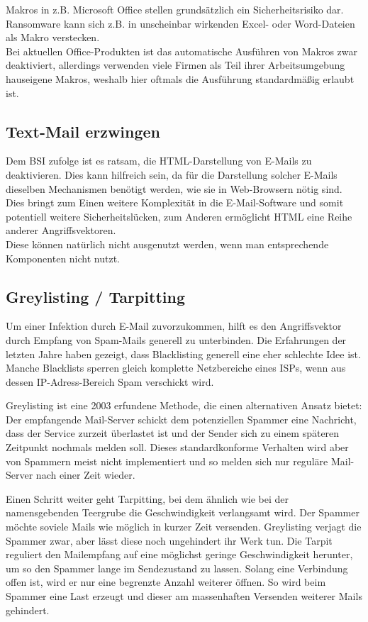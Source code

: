 Makros in z.B. Microsoft Office stellen grundsätzlich ein Sicherheitsrisiko dar. Ransomware kann sich z.B. in unscheinbar wirkenden Excel- oder Word-Dateien als Makro verstecken. \\
Bei aktuellen Office-Produkten ist das automatische Ausführen von Makros zwar deaktiviert, allerdings verwenden viele Firmen als Teil ihrer Arbeitsumgebung hauseigene Makros, weshalb hier oftmals die Ausführung standardmäßig erlaubt ist. 
	
\subsection{Text-Mail erzwingen}
Dem BSI zufolge ist es ratsam, die HTML-Darstellung von E-Mails zu deaktivieren. Dies kann hilfreich sein, da für die Darstellung solcher E-Mails dieselben Mechanismen benötigt werden, wie sie in Web-Browsern nötig sind. Dies bringt zum Einen weitere Komplexität in die E-Mail-Software und somit potentiell weitere Sicherheitslücken, zum Anderen ermöglicht HTML eine Reihe anderer Angriffsvektoren. \\
Diese können natürlich nicht ausgenutzt werden, wenn man entsprechende Komponenten nicht nutzt. \cite{bsi:ransome}
	
	
\subsection{Greylisting / Tarpitting}
	
Um einer Infektion durch E-Mail zuvorzukommen, hilft es den Angriffsvektor durch Empfang von Spam-Mails generell zu unterbinden. Die Erfahrungen der letzten Jahre haben gezeigt, dass Blacklisting generell eine eher schlechte Idee ist. Manche Blacklists sperren gleich komplette Netzbereiche eines ISPs, wenn aus dessen IP-Adress-Bereich Spam verschickt wird.

Greylisting ist eine 2003 erfundene Methode, die einen alternativen Ansatz bietet: Der empfangende Mail-Server schickt dem potenziellen Spammer eine Nachricht, dass der Service zurzeit überlastet ist und der Sender sich zu einem späteren Zeitpunkt nochmals melden soll. Dieses standardkonforme Verhalten wird aber von Spammern meist nicht implementiert und so melden sich nur reguläre Mail-Server nach einer Zeit wieder. \cite{greylisting}

Einen Schritt weiter geht \glqq Tarpitting\grqq{}, bei dem ähnlich wie bei der namensgebenden Teergrube die Geschwindigkeit verlangsamt wird. Der Spammer möchte soviele Mails wie möglich in kurzer Zeit versenden. Greylisting verjagt die Spammer zwar, aber lässt diese noch ungehindert ihr Werk tun. Die Tarpit reguliert den Mailempfang auf eine möglichst geringe Geschwindigkeit herunter, um so den Spammer lange im Sendezustand zu lassen. Solang eine Verbindung offen ist, wird er nur eine begrenzte Anzahl weiterer öffnen. So wird beim Spammer eine Last erzeugt und dieser am massenhaften Versenden weiterer Mails gehindert.
	
